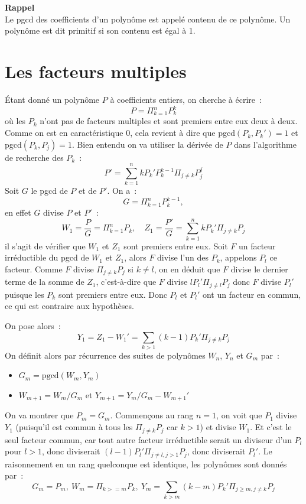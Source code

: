 \documentclass[a4paper,11pt]{book}
\begin{document}
\begin{giacjshere}
{\bf Rappel}\\
Le pgcd des coefficients d'un polynôme est appelé contenu de ce polynôme.
Un polynôme est dit primitif si son contenu est égal à 1.

\section{Les facteurs multiples}  
\'Etant donné un polynôme $P$ à coefficients entiers, on cherche à 
écrire~:
\[ P=\Pi_{k=1}^n P_k^k \]
où les $P_k$ n'ont pas de facteurs multiples et sont premiers entre
eux deux à deux. Comme on est en
caractéristique 0, cela revient à dire que pgcd$(P_k,P_k')=1$
et pgcd$(P_k,P_j)=1$. Bien entendu
on va utiliser la dérivée de $P$ dans l'algorithme de recherche des $P_k$~:
\[ P'=\sum_{k=1}^n kP_k' P_k^{k-1} \Pi_{j\neq k} P_j^j \]
Soit $G$ le pgcd de $P$ et de $P'$. On a~:
\[ G=\Pi_{k=1}^n P_k^{k-1}, \]
en effet $G$ divise $P$ et $P'$~:
\[ W_1=\frac{P}{G}=\Pi_{k=1}^n P_k, \quad 
Z_1=\frac{P'}{G}=\sum_{k=1}^n kP_k'\Pi_{j\neq k} P_j \]
il s'agit de vérifier que $W_1$ et $Z_1$ sont premiers entre eux. Soit $F$ un
facteur irréductible du pgcd de $W_1$ et $Z_1$, alors $F$ divise l'un des 
$P_k$,
appelons $P_l$ ce facteur. Comme $F$ divise $\Pi_{j\neq k} P_j$ si $k\neq l$,
on en déduit que $F$ divise le dernier terme de la somme de $Z_1$, c'est-à-dire
que $F$ divise $lP_l'\Pi_{j\neq l} P_j$ donc $F$ divise $P_l'$ puisque
les $P_k$ sont premiers entre eux. Donc $P_l$ et $P_l'$ ont un facteur
en commun, ce qui est contraire aux hypothèses.

On pose alors~:
\[ Y_1=Z_1-W_1'=\sum_{k>1} (k-1)P_k' \Pi_{j\neq k} P_j \]
On définit alors par récurrence des suites de polynômes $W_n$, $Y_n$ et
$G_m$ par~:
\begin{itemize}
\item $G_m=\mbox{pgcd}(W_m,Y_m)$
\item $W_{m+1}=W_m/G_m$ et $Y_{m+1}=Y_m/G_m-W_{m+1}'$
\end{itemize}
On va montrer que $P_m=G_m$. Commençons au rang $n=1$, on voit que $P_1$
divise $Y_1$ (puisqu'il est commun à tous les $\Pi_{j\neq k} P_j$ car
$k>1$) et divise $W_1$. Et c'est le seul facteur commun, car tout autre
facteur irréductible serait un diviseur d'un $P_l$ pour $l>1$, donc diviserait
$(l-1)P_l'\Pi_{j\neq l,j>1} P_j$, donc diviserait $P_l'$.
Le raisonnement en un rang quelconque est identique, les polynômes sont
donnés par~:
\[ G_m=P_m, \ W_{m}=\Pi_{k>=m} P_k, \ 
Y_{m}=\sum_{k>m} (k-m)P_k'\Pi_{j\geq m, j\neq k} P_j \]


\end{giacjshere}
\end{document}
